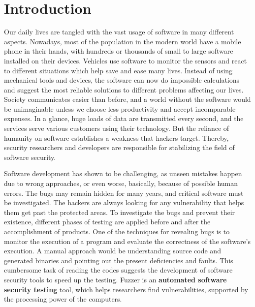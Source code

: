 \section{Introduction}
\label{sec:intro}


Our daily lives are tangled with the vast usage of software in many different aspects. Nowadays, most of the population in the modern world have a mobile phone in their hands, with hundreds or thousands of small to large software installed on their devices. Vehicles use software to monitor the sensors and react to different situations which help save and ease many lives. Instead of using mechanical tools and devices, the software can now do impossible calculations and suggest the most reliable solutions to different problems affecting our lives. Society communicates easier than before, and a world without the software would be unimaginable unless we choose less productivity and accept incomparable expenses. In a glance, huge loads of data are transmitted every second, and the services serve various customers using their technology. But the reliance of humanity on software establishes a weakness that hackers target. Thereby, security researchers and developers are responsible for stabilizing the field of software security.


Software development has shown to be challenging, as unseen mistakes happen due to wrong approaches, or even worse, basically, because of possible human errors. The bugs may remain hidden for many years, and critical software must be investigated. The hackers are always looking for any vulnerability that helps them get past the protected areas. To investigate the bugs and prevent their existence, different phases of testing are applied before and after the accomplishment of products. One of the techniques for revealing bugs is to monitor the execution of a program and evaluate the correctness of the software's execution. A manual approach would be understanding source code and generated binaries and pointing out the present deficiencies and faults. This cumbersome task of reading the codes suggests the development of software security tools to speed up the testing. Fuzzer is an \textbf{automated software security testing} tool, which helps researchers find vulnerabilities, supported by the processing power of the computers.